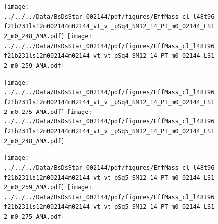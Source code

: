\documentclass[a4paper,10pt]{article}
\begin{document}
\clearpage
\begin{figure}[p]
 \texttt{[image: ../../../Data/BsDsStar\_002144/pdf/figures/EffMass\_cl\_l48t96f21b231ls12m002144m02144\_vt\_vt\_pSq4\_SM12\_14\_PT\_m0\_02144\_LS12\_m0\_248\_AMA.pdf]} 
 \texttt{[image: ../../../Data/BsDsStar\_002144/pdf/figures/EffMass\_cl\_l48t96f21b231ls12m002144m02144\_vt\_vt\_pSq4\_SM12\_14\_PT\_m0\_02144\_LS12\_m0\_259\_AMA.pdf]} 
 \end{figure}
\begin{figure}[p]
 \texttt{[image: ../../../Data/BsDsStar\_002144/pdf/figures/EffMass\_cl\_l48t96f21b231ls12m002144m02144\_vt\_vt\_pSq4\_SM12\_14\_PT\_m0\_02144\_LS12\_m0\_275\_AMA.pdf]} 
 \texttt{[image: ../../../Data/BsDsStar\_002144/pdf/figures/EffMass\_cl\_l48t96f21b231ls12m002144m02144\_vt\_vt\_pSq5\_SM12\_14\_PT\_m0\_02144\_LS12\_m0\_248\_AMA.pdf]} 
 \end{figure}
\begin{figure}[p]
 \texttt{[image: ../../../Data/BsDsStar\_002144/pdf/figures/EffMass\_cl\_l48t96f21b231ls12m002144m02144\_vt\_vt\_pSq5\_SM12\_14\_PT\_m0\_02144\_LS12\_m0\_259\_AMA.pdf]} 
 \texttt{[image: ../../../Data/BsDsStar\_002144/pdf/figures/EffMass\_cl\_l48t96f21b231ls12m002144m02144\_vt\_vt\_pSq5\_SM12\_14\_PT\_m0\_02144\_LS12\_m0\_275\_AMA.pdf]} 
 \end{figure}
\clearpage
\clearpage
\end{document}
